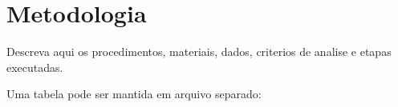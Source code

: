 \chapter{Metodologia}

Descreva aqui os procedimentos, materiais, dados, criterios de analise e etapas executadas.

Uma tabela pode ser mantida em arquivo separado:



